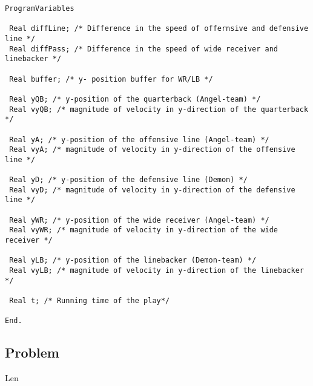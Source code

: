 \begin{lstlisting}
ProgramVariables

 Real diffLine; /* Difference in the speed of offernsive and defensive line */
 Real diffPass; /* Difference in the speed of wide receiver and linebacker */

 Real buffer; /* y- position buffer for WR/LB */

 Real yQB; /* y-position of the quarterback (Angel-team) */
 Real vyQB; /* magnitude of velocity in y-direction of the quarterback */

 Real yA; /* y-position of the offensive line (Angel-team) */
 Real vyA; /* magnitude of velocity in y-direction of the offensive line */

 Real yD; /* y-position of the defensive line (Demon) */
 Real vyD; /* magnitude of velocity in y-direction of the defensive line */

 Real yWR; /* y-position of the wide receiver (Angel-team) */
 Real vyWR; /* magnitude of velocity in y-direction of the wide receiver */

 Real yLB; /* y-position of the linebacker (Demon-team) */
 Real vyLB; /* magnitude of velocity in y-direction of the linebacker */

 Real t; /* Running time of the play*/

End.
\end{lstlisting}

\subsection{Problem}

Len

